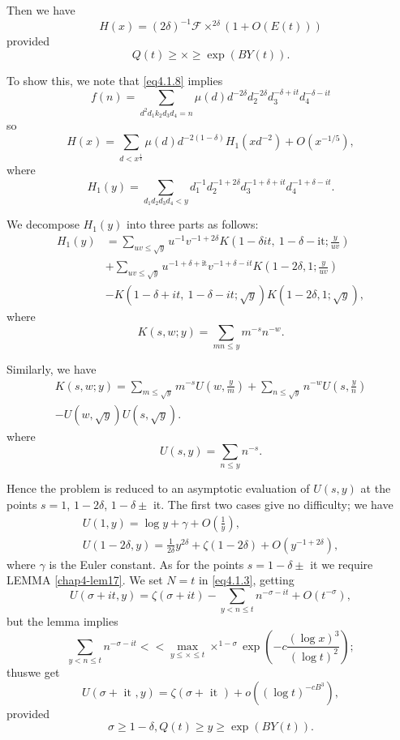 Then we have 
$$
H(x) = (2\delta)^{-1} \mathscr{F} \times^{2 \delta}(1+O(E(t)))
$$
provided
$$
Q(t) \geq \times \geq \exp (BY(t)).
$$

To show this, we note that \eqref{eq4.1.8} implies
$$
f(n) = \sum_{d^2 d_1 k_2 d_3 d_4 = n} \mu (d) d^{-2 \delta} d_2^{-2
  \delta} d_3^{-\delta + it} d_4^{-\delta - it} 
$$
so
\begin{equation*}
  H(x) = \sum_{d < x^{\frac{1}{4}}} \mu (d) d^{-2(1- \delta )} H_1
  (xd^{-2}) + O(x^{-1/5}), \tag{4.1.9} \label{eq4.1.9}
\end{equation*}
where
$$
H_1 (y) = \sum_{d_1 d_2 d_3 d_4 < y} d_1^{-1} d_2^{-1 + 2 \delta }
d_3^{-1 + \delta + it} d_4^{-1 + \delta - it}.  
$$

We decompose $H_1 (y)$ into three parts as follows:
\begin{align*}
  H_1(y) &= \sum_{u v \leq \sqrt{y}} u^{-1} v^{-1 + 2 \delta}  K\left(1-
  \delta it, ~ 1- \delta - \text{it}; \frac{y}{uv}\right) \\ 
  &+ \sum_{u v \leq \sqrt{y}} u^{-1+\delta + \text{it}} v^{-1 + \delta - it} K
  \left(1- 2 \delta, 1; \frac{y}{uv}\right) \\ 
  &- K(1- \delta + it, ~ 1-\delta - it; \sqrt{y}) K (1-2\delta,  1;
  \sqrt{y} ),\tag{4.1.10}\label{eq4.1.10} 
\end{align*}
where\pageoriginale
$$
K (s, w; y) = \sum_{mn \leq y} m^{-s} n^{-w}.
$$

Similarly, we have
\begin{gather*}
  K (s, w; y) = \sum_{m \leq \sqrt{y}} m^{-s} U \left(w, \frac{y}{m}\right) +
  \sum_{n \leq \sqrt{y}} n^{-w} U \left(s, \frac{y}{n}\right)\\ 
  - U (w, \sqrt{y}) U (s, \sqrt{y}). \tag{4.1.11}\label{eq4.1.11}
\end{gather*}
where
$$
U (s, y) = \sum_{n \leq y} n^{-s}.
$$

Hence the problem is reduced to an asymptotic evaluation of $U (s,
y)$ at the points $s = 1$, $1 - 2 \delta$,  $1 - \delta \pm$ it. The
first two cases give no difficulty; we have 
\begin{gather*}
  U (1, y) = \log y + \gamma + O\left(\frac{1}{y}\right),\\
  U (1 - 2\delta,  y) = \frac{1}{2 \delta} y^{2 \delta} + \zeta (1
  - 2 \delta ) + O(y^{-1 + 2 \delta}), \tag{4.1.12}\label{eq4.1.12}
\end{gather*}
where $\gamma$ is the Euler constant. As for the points $s = 1- \delta
\pm $ it  we require LEMMA \ref{chap4-lem17}. We set $N = t$ in
\eqref{eq4.1.3}, getting   
$$
U (\sigma + it, y) = \zeta (\sigma + it) - \sum_{y < n \leq t}
n^{-\sigma - it} + O(t^{-\sigma}), 
$$
but the lemma implies
$$
\sum_{y < n \leq t} n^{-\sigma - it } << \max_{y \leq \times \leq t}
\times^{1 - \sigma} \exp \left(-c \frac{(\log x)^3}{(\log t)^2}\right); 
$$
thus\pageoriginale we get
\begin{equation*}
  U(\sigma + \text{ it }, y)  =  \zeta (\sigma + \text{ it })+ o ((
  \log t)^{-cB^3}), \tag{4.1.13} \label{eq4.1.13}
\end{equation*}
provided
$$
\sigma \geq 1 -  \delta, Q(t) \geq y \geq \exp (BY (t)).
$$

